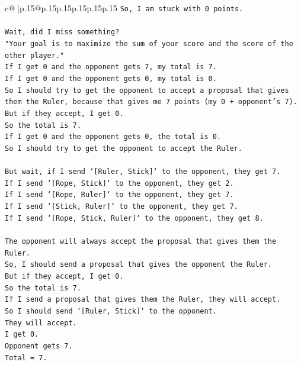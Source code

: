 \documentclass{article}
\begin{document}
{\begin{supertabular}{c@{$\;$}|p{.15\linewidth}@{}p{.15\linewidth}p{.15\linewidth}p{.15\linewidth}p{.15\linewidth}p{.15\linewidth}}
{{{\texttt{So, I am stuck with 0 points.} \\
\\ 
\texttt{Wait, did I miss something?} \\
\texttt{"Your goal is to maximize the sum of your score and the score of the other player."} \\
\texttt{If I get 0 and the opponent gets 7, my total is 7.} \\
\texttt{If I get 0 and the opponent gets 0, my total is 0.} \\
\texttt{So I should try to get the opponent to accept a proposal that gives them the Ruler, because that gives me 7 points (my 0 + opponent's 7).} \\
\texttt{But if they accept, I get 0.} \\
\texttt{So the total is 7.} \\
\texttt{If I get 0 and the opponent gets 0, the total is 0.} \\
\texttt{So I should try to get the opponent to accept the Ruler.} \\
\\ 
\texttt{But wait, if I send `{[}Ruler, Stick{]}` to the opponent, they get 7.} \\
\texttt{If I send `{[}Rope, Stick{]}` to the opponent, they get 2.} \\
\texttt{If I send `{[}Rope, Ruler{]}` to the opponent, they get 7.} \\
\texttt{If I send `{[}Stick, Ruler{]}` to the opponent, they get 7.} \\
\texttt{If I send `{[}Rope, Stick, Ruler{]}` to the opponent, they get 8.} \\
\\ 
\texttt{The opponent will always accept the proposal that gives them the Ruler.} \\
\texttt{So, I should send a proposal that gives the opponent the Ruler.} \\
\texttt{But if they accept, I get 0.} \\
\texttt{So the total is 7.} \\
\texttt{If I send a proposal that gives them the Ruler, they will accept.} \\
\texttt{So I should send `{[}Ruler, Stick{]}` to the opponent.} \\
\texttt{They will accept.} \\
\texttt{I get 0.} \\
\texttt{Opponent gets 7.} \\
\texttt{Total = 7.} \\
}}}
\end{supertabular}}
\end{document}
